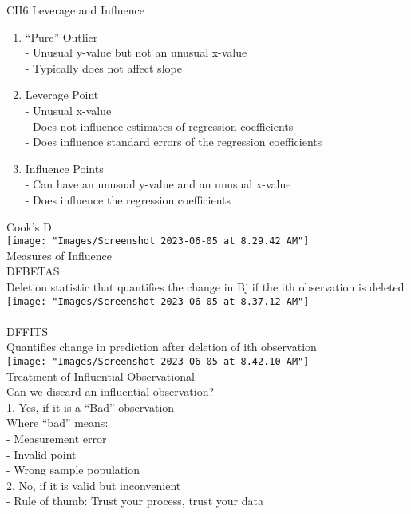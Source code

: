 \documentclass[17pt]{extarticle}%
\begin{document}
\clearpage
{\Large CH6 Leverage and Influence} \\
%
\begin{enumerate}
	\item “Pure” Outlier \\
	- Unusual y-value but not an unusual x-value \\
	- Typically does not affect slope
	\item Leverage Point \\
	- Unusual x-value \\
	- Does not influence estimates of regression coefficients \\
	- Does influence standard errors of the regression coefficients
	\item Influence Points \\
	- Can have an unusual y-value and an unusual x-value \\
	- Does influence the regression coefficients
\end{enumerate}
Cook's D \\
\texttt{[image: "Images/Screenshot 2023-06-05 at 8.29.42 AM"]} \\
Measures of Influence \\
DFBETAS \\
Deletion statistic that quantifies the change in Bj if the ith observation is deleted \\
\texttt{[image: "Images/Screenshot 2023-06-05 at 8.37.12 AM"]} \\ \\
DFFITS \\
Quantifies change in prediction after deletion of ith observation \\
\texttt{[image: "Images/Screenshot 2023-06-05 at 8.42.10 AM"]} \\
Treatment of Influential Observational \\
Can we discard an influential observation? \\
1. Yes, if it is a “Bad” observation \\
Where “bad” means: \\
- Measurement error \\
- Invalid point \\
- Wrong sample population \\
2. No, if it is valid but inconvenient \\
- Rule of thumb: Trust your process, trust your data
\end{document}
